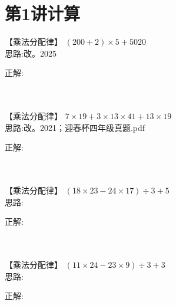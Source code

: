 \section{第1讲\quad 计算}


\item {
    【乘法分配律】
    $(200+2)\times 5 + 5020$ 
    \ifshowSolution
        \fangsong{}
        \\
        思路:改。2025

        正解: 
    \else
        \\ \\ \\
    \fi
}




\item {
    【乘法分配律】
    $7\times 19 + 3\times 13\times 41 + 13\times 19$
    \ifshowSolution
        \fangsong{}
        \\
        思路:改。2021；迎春杯四年级真题.pdf

        正解: 
    \else
        \\ \\ \\
    \fi
}


\item {
    【乘法分配律】
    $(18\times 23 - 24\times 17)\div 3 + 5$
    \ifshowSolution
        \fangsong{}
        \\
        思路:

        正解: 
    \else
        \\ \\ \\
    \fi
}

\item {
    【乘法分配律】
    $(11\times 24 - 23\times 9)\div 3 + 3$
    \ifshowSolution
        \fangsong{}
        \\
        思路:

        正解: 
    \else
        \\ \\ \\
    \fi
}

